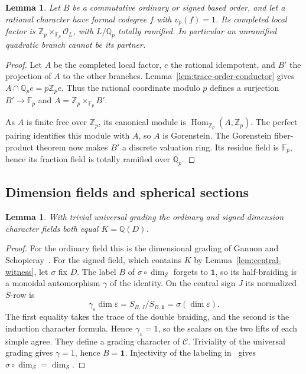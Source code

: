 \documentclass[11pt,reqno]{amsart}
\newtheorem{lemma}[theorem]{Lemma}
\theoremstyle{remark}\newtheorem{remark}[theorem]{Remark}
\numberwithin{equation}{section}
\begin{document}
\begin{lemma}\label{lem:silver-local-partner}
Let $B$ be a commutative ordinary or signed based order, and let a
rational character have formal codegree $f$ with $v_p(f)=1$.
Its completed local factor is
$\mathbb Z_p\times_{\mathbb F_p}\mathcal O_L$, with $L/\mathbb Q_p$
totally ramified. In particular an unramified quadratic branch cannot
be its partner.
\end{lemma}
\begin{proof}
Let $A$ be the completed local factor, $e$ the rational idempotent,
and $B'$ the projection of $A$ to the other branches.
Lemma~\ref{lem:trace-order-conductor} gives
$A\cap\mathbb Q_pe=p\mathbb Z_pe$. Thus the rational coordinate
modulo $p$ defines a surjection $B'\to\mathbb F_p$ and
$A=\mathbb Z_p\times_{\mathbb F_p}B'$.

As $A$ is finite free over $\mathbb Z_p$, its canonical module is
$\operatorname{Hom}_{\mathbb Z_p}(A,\mathbb Z_p)$. The perfect
pairing identifies this module with $A$, so $A$ is Gorenstein.
The Gorenstein fiber-product theorem
\cite[Fact~2.6 and Corollary~2.7]{NTV} now makes $B'$ a discrete
valuation ring. Its residue field is $\mathbb F_p$, hence its
fraction field is totally ramified over $\mathbb Q_p$.
\end{proof}

\subsection{Dimension fields and spherical sections}
\begin{lemma}\label{lem:odd-field-equality}
With trivial universal grading the ordinary and signed dimension
character fields both equal $K=\mathbb Q(D)$.
\end{lemma}
\begin{proof}
For the ordinary field this is the dimensional grading of Gannon and
Schopieray~\cite[\S1.2, (13)]{GSFields}. For the signed field, which
contains $K$ by Lemma~\ref{lem:central-witness}, let $\sigma$ fix $D$.
The label $B$ of $\sigma\circ\dim_{\mathcal S}$ forgets to $\mathbf1$,
so its half-braiding is a monoidal automorphism $\gamma$ of the
identity. On the central sign $J$ its normalized $S$-row is
\[
  \gamma_\varepsilon\dim\varepsilon
  =S_{B,J}/S_{B,\mathbf1}=\sigma(\dim\varepsilon).
\]
The first equality takes the trace of the double braiding, and the
second is the induction character formula. Hence $\gamma_\varepsilon=1$,
so the scalars on the two lifts of each simple agree. They define a
grading character of $\mathcal C$. Triviality of the universal grading
gives $\gamma=1$, hence $B=\mathbf1$. Injectivity of the labeling
in~\cite[Theorem~2.13]{Ostrik3} gives
$\sigma\circ\dim_{\mathcal S}=\dim_{\mathcal S}$.
\end{proof}
\end{document}
